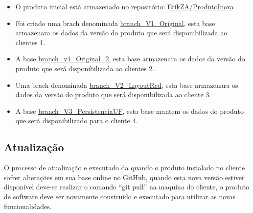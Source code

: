 \documentclass[	DIV=calc,%
							paper=a4,%
							fontsize=12pt,%
							onecolumn]{scrartcl}	 					%
\begin{document}
\begin{itemize}

\item O produto inicial está armazenado no repositório:
\href{https://github.com/ErikZA/ProdutoInova/tree/master}{ErikZA/ProdutoInova}


\item Foi criado uma brach denominada \href{https://github.com/ErikZA/ProdutoInova/tree/branch_V1_Original}{branch\_V1\_Original}, esta base armazenara os dados da versão do produto que será disponibilizada ao clientes 1.

\item A base  \href{https://github.com/ErikZA/ProdutoInova/tree/branch_V1_Original}{branch\_v1\_Original\_2}, esta base armazenara os dados da versão do produto que será disponibilizada ao clientes 2.

\item Uma brach denominada \href{https://github.com/ErikZA/ProdutoInova/tree/branch_V2_LayoutRed}{branch\_V2\_LayoutRed}, esta base armazenara os dados da versão do produto que será disponibilizada ao cliente 3.


\item A base \href{https://github.com/ErikZA/ProdutoInova/tree/branch_V3_PersistenciaUF}{branch\_V3\_PersistenciaUF}, esta base mantem os dados do produto que será disponibilizado para o cliente 4.


\end{itemize}

\subsection{Atualização}

O processo de atualização e executado da quando o produto instalado no cliente sofrer alterações em sua base online no GitHub, quando esta nova versão estiver disponível deve-se realizar o comando “git pull” na maquina do cliente, o produto de software deve ser novamente construído e executado para utilizar as novas funcionalidades.
\end{document}
